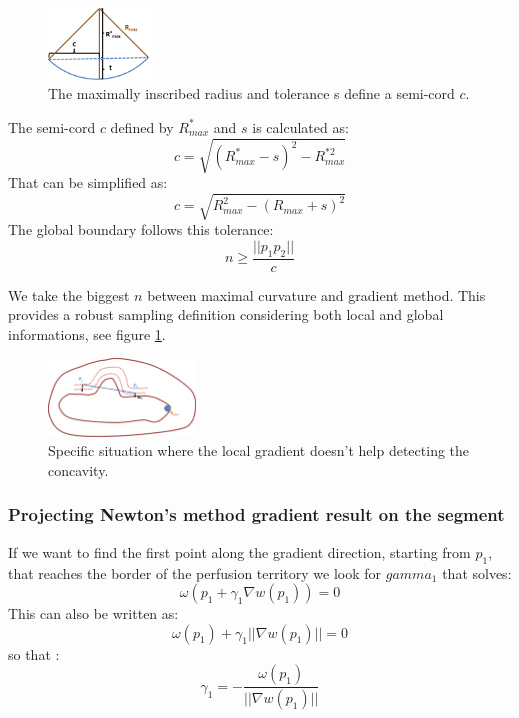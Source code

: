 \documentclass[11pt,a4paper]{article}
\begin{document}
\begin{figure}[h!]
			\centering
			\includegraphics[width=0.25\textwidth]{Drawings/CurvatureTolerance.png}
			\caption{The maximally inscribed radius and tolerance s define a semi-cord $c$.}
\end{figure}

The semi-cord $c$ defined by $R_{max}^*$ and $s$ is calculated as:
\begin{equation}
c = \sqrt{(R_{max}^*-s)^2 - R_{max}^{*2}}
\end{equation} 
That can be simplified as:
\begin{equation}
c = \sqrt{R_{max}^2 - (R_{max} + s)^2}
\end{equation}
The global boundary follows this tolerance:
\begin{equation}
n \geq \frac{||p_1p_2||}{c}
\end{equation}

We take the biggest $n$ between maximal curvature and gradient method. This provides a robust sampling definition considering both local and global informations, see figure \ref{test sampling}.
\begin{figure}[h!]
			\label{test sampling}
			\centering
			\includegraphics[width=0.35\textwidth]{Drawings/CurvatureTestExample2.png}
			\caption{Specific situation where the local gradient doesn't help detecting the concavity.}
\end{figure}

\subsubsection{Projecting Newton's method gradient result on the segment}


If we want to find the first point along the gradient direction, starting from $p_1$, that reaches the border of the perfusion territory we look for $gamma_1$ that solves:
\begin{equation}
\omega( p_1 + \gamma_1 \nabla w(p_1)) = 0
\end{equation}
This can also be written as:
\begin{equation}
\omega(p_1) + \gamma_1 ||\nabla w(p_1)|| = 0
\end{equation}
so that :
\begin{equation}
\gamma_1 = - \frac{\omega(p_1)}{||\nabla w(p_1)||} 
\end{equation}
\end{document}
